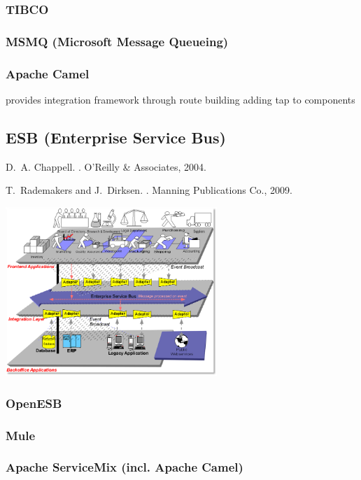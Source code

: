 \documentclass{myproc}
\begin{document}
\subsubsection{TIBCO}
\subsubsection{MSMQ (Microsoft Message Queueing)}
\subsubsection{Apache Camel}
\bit
\w provides integration framework through route building
\w adding tap to components
\eit

\subsection{ESB (Enterprise Service Bus)}
\bit
\w D.~A. Chappell.
.
\newblock O'Reilly \& Associates, 2004.

\w T.~Rademakers and J.~Dirksen.
.
\newblock Manning Publications Co., 2009.

\eit

\centerline{\includegraphics[width=8cm]{pics/esb-01}}


\subsubsection{OpenESB}
\subsubsection{Mule}
\subsubsection{Apache ServiceMix (incl. Apache Camel)}
\end{document}
